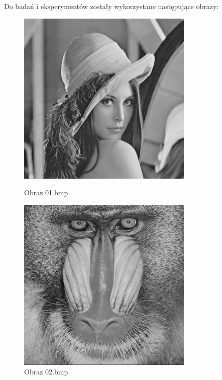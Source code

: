 \documentclass[../EDI_Task4_Karwowski_Kowalewski.tex]{subfiles}
\begin{document}
 {

    Do badań i eksperymentów zostały wykorzystane następujące obrazy:
    \begin{figure}[!htbp]
        \begin{minipage}[c]{0.49\linewidth}
            \centering
            \includegraphics[width=0.75\textwidth]{img/original/01.png}
            \caption{Obraz 01.bmp}
        \end{minipage}\hfill
        \begin{minipage}[c]{0.49\linewidth}
            \centering
            \includegraphics[width=0.75\textwidth]{img/original/02.png}
            \caption{Obraz 02.bmp}
        \end{minipage}
    \end{figure}

}
\end{document}
